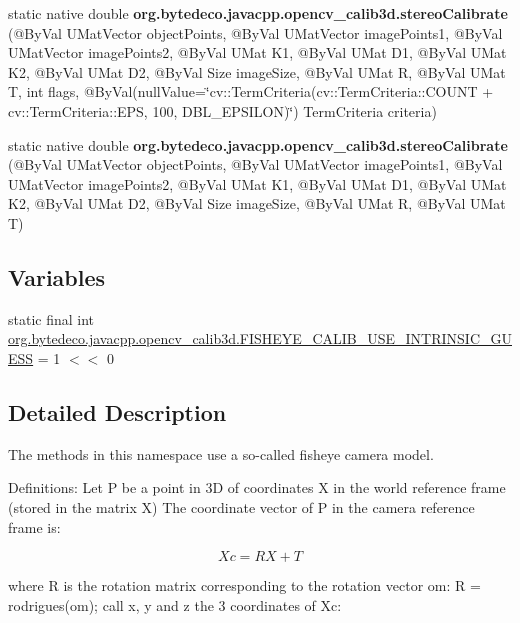\begin{DoxyCompactItemize}
static native double {\bfseries org.\+bytedeco.\+javacpp.\+opencv\+\_\+calib3d.\+stereo\+Calibrate} (@By\+Val U\+Mat\+Vector object\+Points, @By\+Val U\+Mat\+Vector image\+Points1, @By\+Val U\+Mat\+Vector image\+Points2, @By\+Val U\+Mat K1, @By\+Val U\+Mat D1, @By\+Val U\+Mat K2, @By\+Val U\+Mat D2, @By\+Val Size image\+Size, @By\+Val U\+Mat R, @By\+Val U\+Mat T, int flags, @By\+Val(null\+Value=\char`\"{}cv\+::\+Term\+Criteria(cv\+::\+Term\+Criteria\+::\+C\+O\+U\+NT + cv\+::\+Term\+Criteria\+::\+E\+PS, 100, D\+B\+L\+\_\+\+E\+P\+S\+I\+L\+ON)\char`\"{}) Term\+Criteria criteria)
\item 
\mbox{\label{group__calib3d__fisheye_ga2184db43f585bd8e6017c7287ed31e2e}} 
static native double {\bfseries org.\+bytedeco.\+javacpp.\+opencv\+\_\+calib3d.\+stereo\+Calibrate} (@By\+Val U\+Mat\+Vector object\+Points, @By\+Val U\+Mat\+Vector image\+Points1, @By\+Val U\+Mat\+Vector image\+Points2, @By\+Val U\+Mat K1, @By\+Val U\+Mat D1, @By\+Val U\+Mat K2, @By\+Val U\+Mat D2, @By\+Val Size image\+Size, @By\+Val U\+Mat R, @By\+Val U\+Mat T)
\end{DoxyCompactItemize}
\subsection*{Variables}
\begin{DoxyCompactItemize}
\item 
static final int \hyperlink{group__calib3d__fisheye_gac6c55e6235a136952116d157a197869c}{org.\+bytedeco.\+javacpp.\+opencv\+\_\+calib3d.\+F\+I\+S\+H\+E\+Y\+E\+\_\+\+C\+A\+L\+I\+B\+\_\+\+U\+S\+E\+\_\+\+I\+N\+T\+R\+I\+N\+S\+I\+C\+\_\+\+G\+U\+E\+SS} = 1 $<$$<$ 0
\end{DoxyCompactItemize}


\subsection{Detailed Description}
The methods in this namespace use a so-\/called fisheye camera model. 

Definitions\+: Let P be a point in 3D of coordinates X in the world reference frame (stored in the matrix X) The coordinate vector of P in the camera reference frame is\+: 

\[Xc = R X + T\] 

where R is the rotation matrix corresponding to the rotation vector om\+: R = rodrigues(om); call x, y and z the 3 coordinates of Xc\+: 

